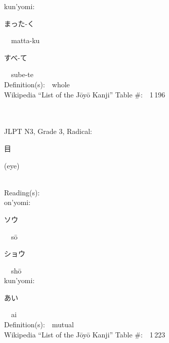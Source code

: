 \begin{multicols}{2}
{\hspace*{1em}}kun'yomi:\ \ \\
{\hspace*{2em}}{\begin{CJK}{UTF8}{min} まった-く \end{CJK}}\ \ matta-ku\ \ \\
{\hspace*{2em}}{\begin{CJK}{UTF8}{min} すべ-て \end{CJK}}\ \ sube-te\ \ \\
Definition(s):\ \ whole \\
Wikipedia ``List of the J\=oy\=o Kanji'' Table \#:\ \ 1\,196 \\
\ \ \\
{\fontsize{34pt}{40pt}  }\ \ \\  %
{JLPT N3, Grade 3, Radical:\ \ {\begin{CJK}{UTF8}{min} 目 \end{CJK}} (eye) } \\
Reading(s):\ \ \\
{\hspace*{1em}}on'yomi:\ \ \\
{\hspace*{2em}}{\begin{CJK}{UTF8}{min} ソウ \end{CJK}}\ \ s\=o\ \ \\
{\hspace*{2em}}{\begin{CJK}{UTF8}{min} ショウ \end{CJK}}\ \ sh\=o\ \ \\
{\hspace*{1em}}kun'yomi:\ \ \\
{\hspace*{2em}}{\begin{CJK}{UTF8}{min} あい \end{CJK}}\ \ ai\ \ \\
Definition(s):\ \ mutual \\
Wikipedia ``List of the J\=oy\=o Kanji'' Table \#:\ \ 1\,223 \\
\ \ \\
{\fontsize{34pt}{40pt}  }\ \ \\  %

\end{multicols}
